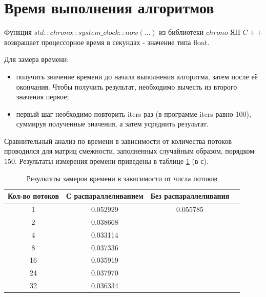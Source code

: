 \section{Время выполнения алгоритмов}

Функция $std::chrono::system\_clock::now(...)$ из библиотеки $chrono$ ЯП $C++$ возвращает  процессорное время в секундах - значение типа float.

Для замера времени:
\begin{itemize}
	\item получить значение времени до начала выполнения алгоритма, затем после её окончания. Чтобы получить результат, необходимо вычесть из второго значения первое;
	\item первый шаг необходимо повторить iters раз (в программе iters равно 100), суммируя полученные значения, а затем усреднить результат.
\end{itemize}

Сравнительный анализ по времени в зависимости от количества потоков проводился для матриц смежности, заполненных случайным образом, порядком 150. Результаты измерения времени приведены в таблице \ref{tbl:time_count_threads} (в с).

\begin{table}[h]
    \begin{center}
        \begin{threeparttable}
        \captionsetup{justification=raggedright,singlelinecheck=off}
        \caption{Результаты замеров времени в зависимости от числа потоков}
        \label{tbl:time_count_threads}
        \begin{tabular}{|c|c|c|c|}
            \hline
            Кол-во потоков & С распараллеливанием  & Без распараллеливания \\
            \hline
            1 & 0.052929 & 0.055785 \\ \hline  
            2 & 0.038668 &          \\ \hline
            4 & 0.033114 &          \\ \hline
            8 & 0.037336 &          \\ \hline 
            16 & 0.035919 &          \\ \hline 
            24 & 0.037970 &          \\ \hline 
            32 & 0.036334 &          \\ \hline
		\end{tabular}
    \end{threeparttable}
\end{center}
\end{table}

